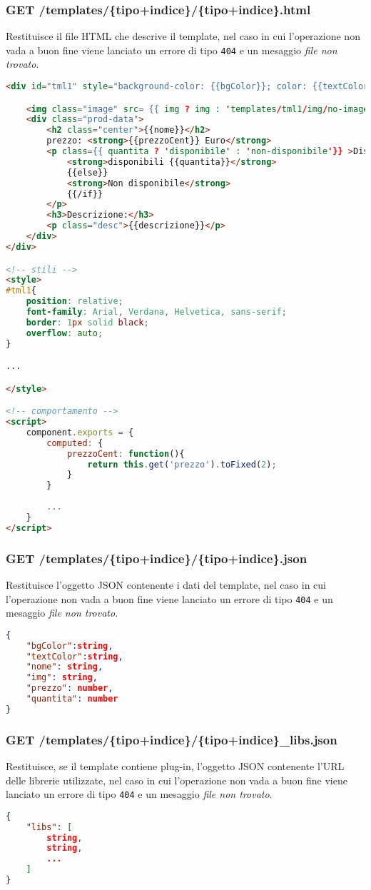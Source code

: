 \subsubsection{GET /templates/\{tipo+indice\}/\{tipo+indice\}.html}
Restituisce il file HTML che descrive il template, nel caso in cui l'operazione non vada a buon fine viene lanciato un errore di tipo \texttt{404} e un mesaggio \textit{file non trovato}.
\begin{lstlisting}[language=HTML, caption=Esempio di template mustache restituito.]
<div id="tml1" style="background-color: {{bgColor}}; color: {{textColor}};">

	<img class="image" src= {{ img ? img : 'templates/tml1/img/no-image.png'}}>
	<div class="prod-data">
		<h2 class="center">{{nome}}</h2>
		prezzo: <strong>{{prezzoCent}} Euro</strong>
		<p class={{ quantita ? 'disponibile' : 'non-disponibile'}} >Disponibilità: {{#if quantita}}
			<strong>disponibili {{quantita}}</strong>
			{{else}}
			<strong>Non disponibile</strong>
			{{/if}}
		</p>
		<h3>Descrizione:</h3>
		<p class="desc">{{descrizione}}</p>
	</div>
</div>

<!-- stili -->
<style>
#tml1{
	position: relative;
	font-family: Arial, Verdana, Helvetica, sans-serif;
	border: 1px solid black;
	overflow: auto;
}

...

</style>

<!-- comportamento -->
<script>
	component.exports = {
		computed: {
			prezzoCent: function(){
				return this.get('prezzo').toFixed(2);
			}
		}
		
		...
	}
</script>
\end{lstlisting}

\subsubsection{GET /templates/\{tipo+indice\}/\{tipo+indice\}.json}
Restituisce l'oggetto JSON contenente i dati del template, nel caso in cui l'operazione non vada a buon fine viene lanciato un errore di tipo \texttt{404} e un mesaggio \textit{file non trovato}.
\begin{lstlisting}[language=JSON, caption=Esempio di oggetto JSON restituito.]
{
	"bgColor":string,
	"textColor":string,
	"nome": string,
	"img": string,
	"prezzo": number,
	"quantita": number
}
\end{lstlisting}
\subsubsection{GET /templates/\{tipo+indice\}/\{tipo+indice\}\_libs.json}
Restituisce, se il template contiene plug-in, l'oggetto JSON contenente l'URL delle librerie utilizzate, nel caso in cui l'operazione non vada a buon fine viene lanciato un errore di tipo \texttt{404} e un mesaggio \textit{file non trovato}.
\begin{lstlisting}[language=JSON, caption=Esempio di oggetto JSON restituito.]
{
	"libs": [
		string,
		string,
		...
	]
}
\end{lstlisting}

